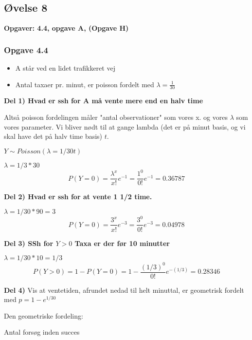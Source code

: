 \horizline

\subsection{Øvelse 8}

\textbf{Opgaver: 4.4, opgave A, (Opgave H)}


\subsubsection{Opgave 4.4}

\begin{itemize}
    \item A står ved en lidet trafikkeret vej
    \item Antal taxaer pr. minut, er poisson fordelt med $\lambda = \frac{1}{30}$
\end{itemize}

\textbf{Del 1) Hvad er ssh for A må vente mere end en halv time}

Altså poisson fordelingen måler "antal observationer" som vores x. og vores $\lambda$ som vores parameter. Vi bliver nødt til at gange lambda (det er på minut basis, og vi skal have det på halv time basis) $t$.

$Y \sim Poisson( \lambda = 1/30 t)$


$\lambda = 1/3 * 30$
\begin{equation}
    P(Y = 0) =\frac{\lambda^x}{x!}e^{-1} = \frac{1^0}{0!}e^{-1} = 0.36787
\end{equation}

\textbf{Del 2) Hvad er ssh for at vente 1 1/2 time.}


$\lambda = 1/30 * 90 = 3$
\begin{equation}
    P(Y = 0) =\frac{3^x}{x!}e^{-3} = \frac{3^0}{0!}e^{-3} = 0.04978
\end{equation}


\textbf{Del 3) SSh for $Y>0$ Taxa er der før 10 minutter}

$\lambda = 1/30 * 10 = 1/3$
\begin{equation}
    P(Y > 0) =1 - P(Y=0) = 1 -  \frac{(1/3)^0}{0!}e^{-(1/3)} = 0.28346
\end{equation}


\textbf{Del 4)} Vis at ventetiden, afrundet nedad til helt minuttal, er geometrisk fordelt med $p=1 - e^{1/30}$

Den geometriske fordeling:

Antal forsøg inden succes

